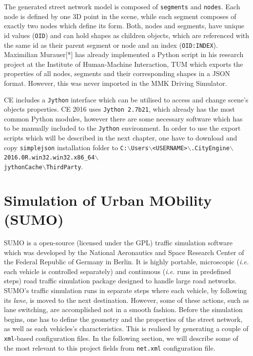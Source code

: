 The generated street network model is composed of \texttt{segments} and \texttt{nodes}. Each node is defined by one 3D point in the scene, while each segment composes of exactly two nodes which define its form. Both, nodes and segments, have unique id values (\texttt{OID}) and can hold shapes as children objects, which are referenced with the same id as their parent segment or node and an index (\texttt{OID:INDEX}). Maximilian Murauer[*] has already implemented a Python script in his research project at the Institute of Human-Machine Interaction, TUM which exports the properties of all nodes, segments and their corresponding shapes in a JSON format. However, this was never imported in the MMK Driving Simulator.

CE includes a \texttt{Jython} interface which can be utilised to access and change scene's objects properties. CE 2016 uses \texttt{Jython 2.7b21}, which already has the most common Python modules, however there are some necessary software which has to be manually included to the \texttt{Jython} environment. In order to use the export scripts which will be described in the next chapter, one have to download and copy \texttt{simplejson} installation folder to \texttt{C:$\backslash$Users$\backslash$<USERNAME>$\backslash$.CityEngine$\backslash$2016.0R.win32.win32.x86\_64$\backslash$\\jythonCache$\backslash$ThirdParty}.

\section{Simulation of Urban MObility (SUMO)}
\label{ch:sumo}
SUMO is a open-source (licensed under the GPL) traffic simulation software which was developed by the National Aeronautics and Space Research Center of the Federal Republic of Germany in Berlin. It is highly portable, microscopic (\emph{i.e.} each vehicle is controlled separately) and continuous (\emph{i.e.} runs in predefined steps) road traffic simulation package designed to handle large road networks. SUMO's traffic simulation runs in separate steps where each vehicle, by following its \emph{lane}, is moved to the next destination. However, some of these actions, such as lane switching, are accomplished not in a smooth fashion. Before the simulation begins, one has to define the geometry and the properties of the street network, as well as each vehicles's characteristics. This is realised by generating a couple of \texttt{xml}-based configuration files. In the following section, we will describe some of the most relevant to this project fields from \texttt{net.xml} configuration file.

